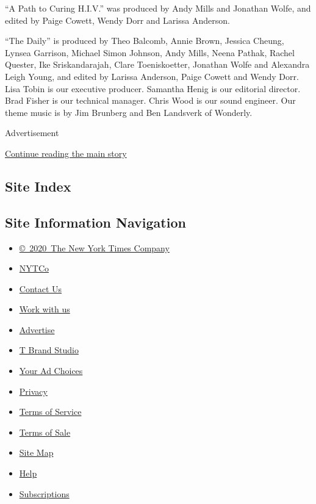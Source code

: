 ``A Path to Curing H.I.V.'' was produced by Andy Mills and Jonathan
Wolfe, and edited by Paige Cowett, Wendy Dorr and Larissa Anderson.

``The Daily'' is produced by Theo Balcomb, Annie Brown, Jessica Cheung,
Lynsea Garrison, Michael Simon Johnson, Andy Mills, Neena Pathak, Rachel
Quester, Ike Sriskandarajah, Clare Toeniskoetter, Jonathan Wolfe and
Alexandra Leigh Young, and edited by Larissa Anderson, Paige Cowett and
Wendy Dorr. Lisa Tobin is our executive producer. Samantha Henig is our
editorial director. Brad Fisher is our technical manager. Chris Wood is
our sound engineer. Our theme music is by Jim Brunberg and Ben Landsverk
of Wonderly.

Advertisement

\protect\hyperlink{after-bottom}{Continue reading the main story}

\hypertarget{site-index}{%
\subsection{Site Index}\label{site-index}}

\hypertarget{site-information-navigation}{%
\subsection{Site Information
Navigation}\label{site-information-navigation}}

\begin{itemize}
\tightlist
\item
  \href{https://help.nytimes.com/hc/en-us/articles/115014792127-Copyright-notice}{©~2020~The
  New York Times Company}
\end{itemize}

\begin{itemize}
\tightlist
\item
  \href{https://www.nytco.com/}{NYTCo}
\item
  \href{https://help.nytimes.com/hc/en-us/articles/115015385887-Contact-Us}{Contact
  Us}
\item
  \href{https://www.nytco.com/careers/}{Work with us}
\item
  \href{https://nytmediakit.com/}{Advertise}
\item
  \href{http://www.tbrandstudio.com/}{T Brand Studio}
\item
  \href{https://www.nytimes.com/privacy/cookie-policy\#how-do-i-manage-trackers}{Your
  Ad Choices}
\item
  \href{https://www.nytimes.com/privacy}{Privacy}
\item
  \href{https://help.nytimes.com/hc/en-us/articles/115014893428-Terms-of-service}{Terms
  of Service}
\item
  \href{https://help.nytimes.com/hc/en-us/articles/115014893968-Terms-of-sale}{Terms
  of Sale}
\item
  \href{https://spiderbites.nytimes.com}{Site Map}
\item
  \href{https://help.nytimes.com/hc/en-us}{Help}
\item
  \href{https://www.nytimes.com/subscription?campaignId=37WXW}{Subscriptions}
\end{itemize}
